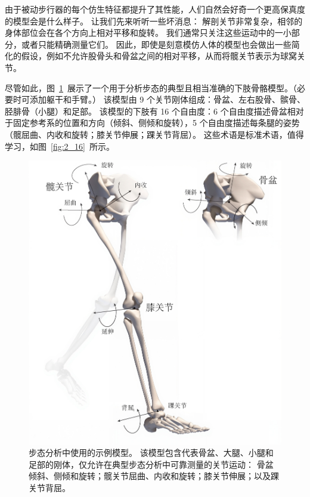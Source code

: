 由于被动步行器的每个仿生特征都提升了其性能，人们自然会好奇一个更高保真度的模型会是什么样子。
让我们先来听听一些坏消息：
解剖关节非常复杂，相邻的身体部位会在各个方向上相对平移和旋转。
我们通常只关注这些运动中的一小部分，或者只能精确测量它们。
因此，即使是刻意模仿人体的模型也会做出一些简化的假设，例如不允许股骨头和骨盆之间的相对平移，从而将髋关节表示为球窝关节。


尽管如此，图~\ref{fig:2_17}~展示了一个用于分析步态的典型且相当准确的下肢骨骼模型。（必要时可添加躯干和手臂。）
该模型由 9 个关节刚体组成：骨盆、左右股骨、髌骨、胫腓骨（小腿）和足部。
该模型的下肢有 16 个自由度：6 个自由度描述骨盆相对于固定参考系的位置和方向（倾斜、侧倾和旋转），5 个自由度描述每条腿的姿势（髋屈曲、内收和旋转；膝关节伸展；踝关节背屈）。
这些术语是标准术语，值得学习，如图~\ref{fig:2_16}~所示。

\begin{figure}[!htb]
	\centering
	\includegraphics[width=1.0\linewidth]{chap2/2_17}
	\caption{步态分析中使用的示例模型。
		该模型包含代表骨盆、大腿、小腿和足部的刚体，仅允许在典型步态分析中可靠测量的关节运动：
		骨盆倾斜、侧倾和旋转；髋关节屈曲、内收和旋转；膝关节伸展；以及踝关节背屈\cite{rajagopal2016full}。 \label{fig:2_17}}
\end{figure}


